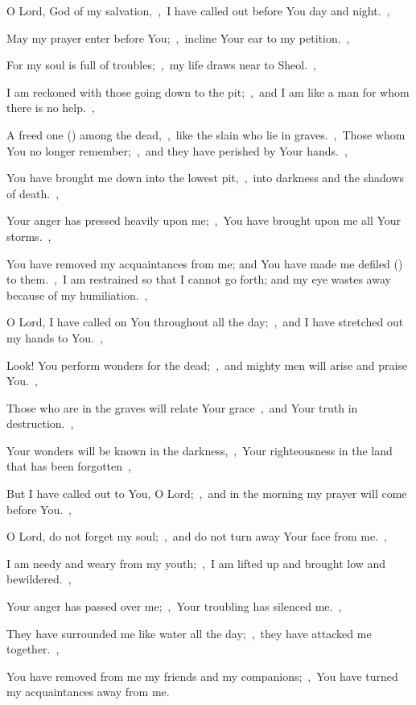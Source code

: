 \documentclass[12pt,twoside,a5paper]{article}
\begin{document}
\begin{normalparskip}
  O Lord, God of my salvation,~\sep\ I have called out before You day and night.~\sep


  May my prayer enter before You;~\sep\ incline Your ear to my petition.~\sep

  For my soul is full of troubles;~\sep\ my life draws near to Sheol.~\sep

  I am reckoned with those going down to the pit;~\sep\ and I am like a man for whom there is no help.~\sep

  A freed one () among the dead,~\sep\ like the slain who lie in graves.~\sep\ Those whom You no longer remember;~\sep\ and they have perished by Your hands.~\sep

  You have brought me down into the lowest pit,~\sep\ into darkness and the shadows of death.~\sep

  Your anger has pressed heavily upon me;~\sep\ You have brought upon me all Your storms.~\sep

  You have removed my acquaintances from me; and You have made me defiled () to them.~\sep\ I am restrained so that I cannot go forth; and my eye wastes away because of my humiliation.~\sep

  O Lord, I have called on You throughout all the day;~\sep\ and I have stretched out my hands to You.~\sep

  Look! You perform wonders for the dead;~\sep\ and mighty men will arise and praise You.~\sep

  Those who are in the graves will relate Your grace~\sep\ and Your truth in destruction.~\sep

  Your wonders will be known in the darkness,~\sep\ Your righteousness in the land that has been forgotten~\sep

  But I have called out to You, O Lord;~\sep\ and in the morning my prayer will come before You.~\sep

  O Lord, do not forget my soul;~\sep\ and do not turn away Your face from me.~\sep

  I am needy and weary from my youth;~\sep\ I am lifted up and brought low and bewildered.~\sep

  Your anger has passed over me;~\sep\ Your troubling has silenced me.~\sep

  They have surrounded me like water all the day;~\sep\ they have attacked me together.~\sep

  You have removed from me my friends and my companions;~\sep\ You have turned my acquaintances away from me.
\end{normalparskip}
\end{document}
